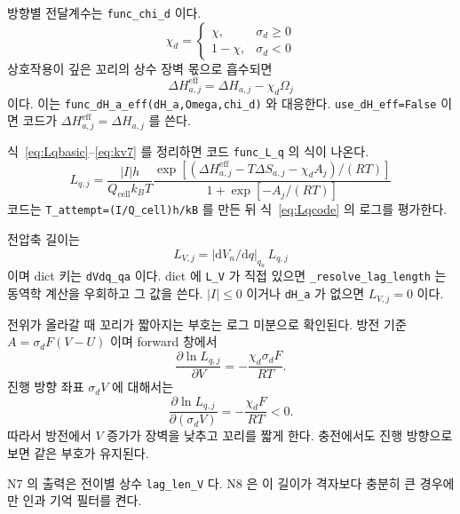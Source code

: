 \documentclass[11pt,a4paper]{article}
\newcommand{\dd}{\mathrm{d}}
\newcommand{\cell}{\mathrm{cell}}
\newcommand{\eff}{\mathrm{eff}}
\begin{document}
방향별 전달계수는 \texttt{func\_chi\_d} 이다.
\begin{equation}
\boxed{\;\chi_d=
\begin{cases}
\chi,&\sigma_d\ge0\\
1-\chi,&\sigma_d<0
\end{cases}\;}
\label{eq:chid}
\end{equation}
상호작용이 깊은 꼬리의 상수 장벽 몫으로 흡수되면
\begin{equation}
\boxed{\;\Delta H_{a,j}^{\eff}=\Delta H_{a,j}-\chi_d\Omega_j\;}
\label{eq:dHaeff}
\end{equation}
이다. 이는 \texttt{func\_dH\_a\_eff(dH\_a,Omega,chi\_d)} 와 대응한다. \texttt{use\_dH\_eff=False} 이면 코드가 $\Delta H_{a,j}^{\eff}=\Delta H_{a,j}$ 를 쓴다.

식~\eqref{eq:Lqbasic}--\eqref{eq:kv7} 를 정리하면 코드 \texttt{func\_L\_q} 의 식이 나온다.
\begin{equation}
\boxed{\;L_{q,j}=
\frac{|I|h}{Q_\cell k_BT}
\frac{\exp[(\Delta H_{a,j}^{\eff}-T\Delta S_{a,j}-\chi_d A_j)/(RT)]}
{1+\exp[-A_j/(RT)]}\;}
\label{eq:Lqcode}
\end{equation}
코드는 \texttt{T\_attempt=(I/Q\_cell)h/kB} 를 만든 뒤 식~\eqref{eq:Lqcode} 의 로그를 평가한다.

전압축 길이는
\begin{equation}
\boxed{\;L_{V,j}=|\dd V_n/\dd q|_{q_a}\,L_{q,j}\;}
\label{eq:LV}
\end{equation}
이며 dict 키는 \texttt{dVdq\_qa} 이다. dict 에 \texttt{L\_V} 가 직접 있으면 \texttt{\_resolve\_lag\_length} 는 동역학 계산을 우회하고 그 값을 쓴다. $|I|\le0$ 이거나 \texttt{dH\_a} 가 없으면 $L_{V,j}=0$ 이다.

전위가 올라갈 때 꼬리가 짧아지는 부호는 로그 미분으로 확인된다. 방전 기준 $A=\sigma_dF(V-U)$ 이며 forward 창에서
\begin{equation}
\frac{\partial\ln L_{q,j}}{\partial V}
=-\frac{\chi_d\sigma_dF}{RT}.
\label{eq:dlnLdVraw}
\end{equation}
진행 방향 좌표 $\sigma_dV$ 에 대해서는
\begin{equation}
\frac{\partial\ln L_{q,j}}{\partial(\sigma_dV)}
=-\frac{\chi_dF}{RT}<0.
\label{eq:dlnLdV}
\end{equation}
따라서 방전에서 $V$ 증가가 장벽을 낮추고 꼬리를 짧게 한다. 충전에서도 진행 방향으로 보면 같은 부호가 유지된다.

N7 의 출력은 전이별 상수 \texttt{lag\_len\_V} 다. N8 은 이 길이가 격자보다 충분히 큰 경우에만 인과 기억 필터를 켠다.
\end{document}
